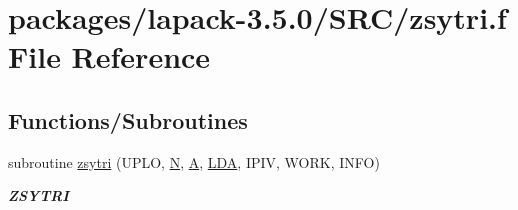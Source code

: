\hypertarget{zsytri_8f}{}\section{packages/lapack-\/3.5.0/\+S\+R\+C/zsytri.f File Reference}
\label{zsytri_8f}
\subsection*{Functions/\+Subroutines}
\begin{DoxyCompactItemize}
\item 
subroutine \hyperlink{group__complex16SYcomputational_gae35a5df45bbca6c8caa41d5f83dc1ccf}{zsytri} (U\+P\+L\+O, \hyperlink{polmisc_8c_a0240ac851181b84ac374872dc5434ee4}{N}, \hyperlink{classA}{A}, \hyperlink{example__user_8c_ae946da542ce0db94dced19b2ecefd1aa}{L\+D\+A}, I\+P\+I\+V, W\+O\+R\+K, I\+N\+F\+O)
\begin{DoxyCompactList}\small\item\em {\bfseries Z\+S\+Y\+T\+R\+I} \end{DoxyCompactList}\end{DoxyCompactItemize}
